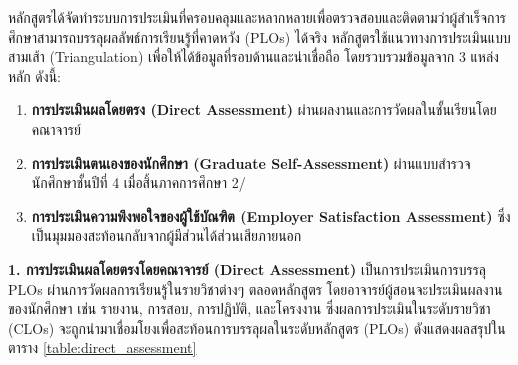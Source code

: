 \begin{doclist}
\end{doclist}





หลักสูตรได้จัดทำระบบการประเมินที่ครอบคลุมและหลากหลายเพื่อตรวจสอบและติดตามว่าผู้สำเร็จการศึกษาสามารถบรรลุผลลัพธ์การเรียนรู้ที่คาดหวัง (PLOs) ได้จริง หลักสูตรใช้แนวทางการประเมินแบบสามเส้า (Triangulation) เพื่อให้ได้ข้อมูลที่รอบด้านและน่าเชื่อถือ โดยรวบรวมข้อมูลจาก 3 แหล่งหลัก ดังนี้:
\begin{enumerate}
\item \textbf{การประเมินผลโดยตรง (Direct Assessment)} ผ่านผลงานและการวัดผลในชั้นเรียนโดยคณาจารย์
\item \textbf{การประเมินตนเองของนักศึกษา (Graduate Self-Assessment)} ผ่านแบบสำรวจนักศึกษาชั้นปีที่ 4 เมื่อสิ้นภาคการศึกษา 2/\printyear{}
\item \textbf{การประเมินความพึงพอใจของผู้ใช้บัณฑิต (Employer Satisfaction Assessment)} ซึ่งเป็นมุมมองสะท้อนกลับจากผู้มีส่วนได้ส่วนเสียภายนอก
\end{enumerate}


\noindent\textbf{1. การประเมินผลโดยตรงโดยคณาจารย์ (Direct Assessment)}
เป็นการประเมินการบรรลุ PLOs ผ่านการวัดผลการเรียนรู้ในรายวิชาต่างๆ ตลอดหลักสูตร  โดยอาจารย์ผู้สอนจะประเมินผลงานของนักศึกษา เช่น รายงาน, การสอบ, การปฏิบัติ, และโครงงาน ซึ่งผลการประเมินในระดับรายวิชา (CLOs) จะถูกนำมาเชื่อมโยงเพื่อสะท้อนการบรรลุผลในระดับหลักสูตร (PLOs) ดังแสดงผลสรุปในตาราง \ref{table:direct_assessment}


